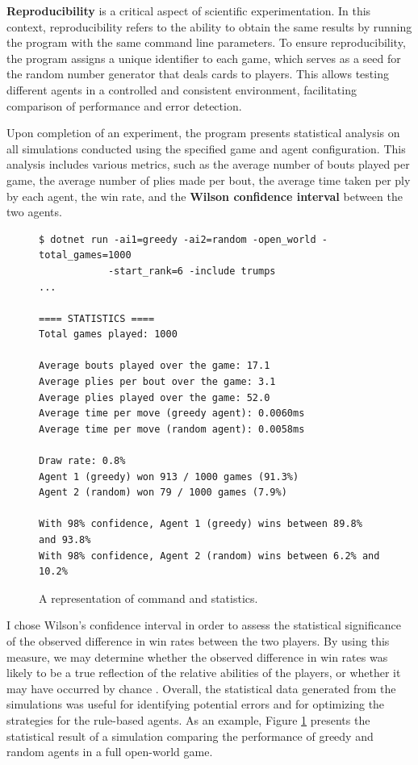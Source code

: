 \textbf{Reproducibility} is a critical aspect of scientific experimentation. In this context, reproducibility refers to the ability to obtain the same results by running the program with the same command line parameters. To ensure reproducibility, the program assigns a unique identifier to each game, which serves as a seed for the random number generator that deals cards to players. This allows testing  different agents in a controlled and consistent environment, facilitating comparison of performance and error detection.

Upon completion of an experiment, the program presents statistical analysis on all simulations conducted using the specified game and agent configuration. This analysis includes various metrics, such as the average number of bouts played per game, the average number of plies made per bout, the average time taken per ply by each agent, the win rate, and the \textbf{Wilson confidence interval} between the two agents.

\begin{figure}[h]
\captionsetup{justification=centering}
\begin{lstlisting}
$ dotnet run -ai1=greedy -ai2=random -open_world -total_games=1000 
			-start_rank=6 -include trumps
...

==== STATISTICS ====
Total games played: 1000

Average bouts played over the game: 17.1
Average plies per bout over the game: 3.1
Average plies played over the game: 52.0
Average time per move (greedy agent): 0.0060ms
Average time per move (random agent): 0.0058ms

Draw rate: 0.8%
Agent 1 (greedy) won 913 / 1000 games (91.3%)
Agent 2 (random) won 79 / 1000 games (7.9%)

With 98% confidence, Agent 1 (greedy) wins between 89.8% and 93.8%
With 98% confidence, Agent 2 (random) wins between 6.2% and 10.2%
\end{lstlisting}
\caption{A representation of command and statistics.}
\label{fig:statistics}
\end{figure}

I chose Wilson's confidence interval in order to assess the statistical significance of the observed difference in win rates between the two players. By using this measure, we may determine whether the observed difference in win rates was likely to be a true reflection of the relative abilities of the players, or whether it may have occurred by chance \citep{moore_mccabe_craig_2017}. Overall, the statistical data generated from the simulations was useful for identifying potential errors and for optimizing the strategies for the rule-based agents. As an example, Figure \ref{fig:statistics}  presents the statistical result of a simulation comparing the performance of greedy and random agents in a full open-world game.

